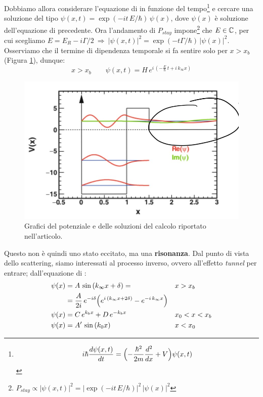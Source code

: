 \newpage
\noindent Dobbiamo allora considerare l'equazione di \Sch{} in funzione del tempo\footnote{$$i\hbar \frac{d\psi(x,t)}{dt} = \Bigl ( -\frac{\hbar^2}{2m}\frac{d^2}{dx}+V \Bigr )\psi(x,t)$$} e cercare una soluzione del tipo $\psi(x,t) = \exp{(-i t \, E/\hbar)}\,\psi(x)$, dove $\psi(x)$ è soluzione dell'equazione di \Sch{} precedente. Ora l'andamento di $P_{stay}$ impone\footnote{$P_{stay}\propto |\psi(x,t)|^2 = |\exp{(-i t \, E/\hbar)}|^2\,|\psi(x)|^2$} che $E\in \mathbb{C}$, per cui scegliamo $E = E_R - i \Gamma/2 \:\Rightarrow\: |\psi(x,t)|^2 = \exp{(-t\Gamma/\hbar)}\,|\psi(x)|^2$. Osserviamo che il termine di dipendenza temporale si fa sentire solo per $x>x_b$ (Figura \ref{0325_ris2}), dunque:
$$x>x_b \qquad \psi(x,t) = H\,e^{i\,(-\frac{E}{\hbar}\,t + i\,k_\infty x)}$$
\begin{figure}[h]
    \centering
    \includegraphics[scale=0.4]{Immagini/0325_risonanza2.png}
    \caption{Grafici del potenziale e delle soluzioni del calcolo riportato nell'articolo.}
    \label{0325_ris2}
\end{figure}
\noindent Questo non è quindi uno stato eccitato, ma una \textbf{risonanza}. Dal punto di vista dello scattering, siamo interessati al processo inverso, ovvero all'effetto \textit{tunnel} per entrare; dall'equazione di \Sch{}:
\begin{displaymath}
\begin{aligned}
\psi(x)&= A\, \sin{(k_\infty x +\delta)} = & &x>x_b \\
&= \frac{A}{2i} \, e^{-i\delta}\Bigl ( e^{i\,(k_\infty x + 2\delta)} - e^{-i\,k_\infty x} \Bigr ) & \\
\psi(x)&= C\, e^{k_b x} + D\, e^{-k_b x} & &x_0<x<x_b \\
\psi(x)&= A'\, \sin{(k_0 x)} & &x<x_0 
\end{aligned}
\end{displaymath}
